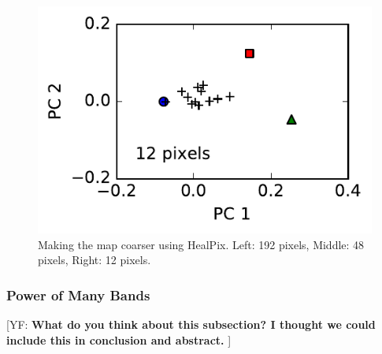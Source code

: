 \documentclass[iop,numberedappendix,apj,]{emulateapj}
\def\memoYF#1{\color{red}[YF: {\bf #1}]\color{black}}
\begin{document}
\begin{figure}[tbh!]
\begin{minipage}{0.33\hsize}
\begin{center}
\includegraphics[width=\hsize]{IGBP_PCplane_Nside0.pdf}
    \end{center}
     \end{minipage}
    \caption{Making the map coarser using HealPix. Left: 192 pixels, Middle: 48 pixels, Right: 12 pixels. }
\label{fig:lowresolution}
\end{figure}


\subsubsection{Power of Many Bands}

\memoYF{What do you think about this subsection? I thought we could include this in conclusion and abstract. }
\end{document}
